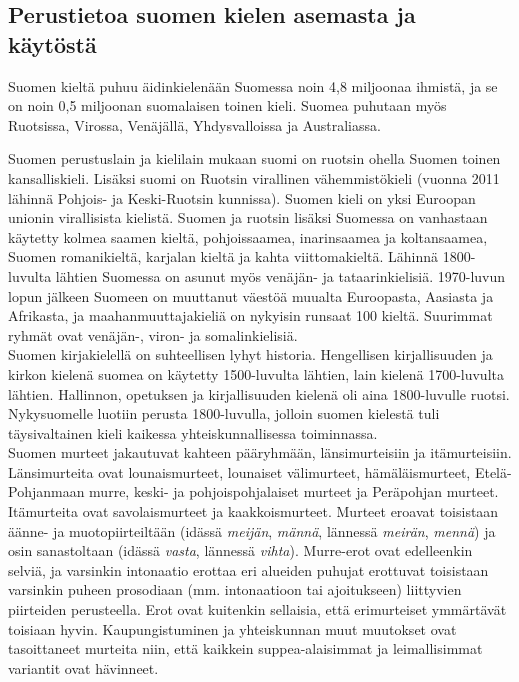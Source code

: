 \begin{multicols}{2}
\subsection{Perustietoa suomen kielen asemasta ja käytöstä}



Suomen kieltä puhuu äidinkielenään Suomessa noin 4,8 miljoonaa ihmistä, ja
se on noin 0,5 miljoonan suomalaisen toinen kieli. Suomea puhutaan myös
Ruotsissa, Virossa, Venäjällä, Yhdysvalloissa ja Australiassa.

Suomen perustuslain ja kielilain mukaan suomi on ruotsin ohella Suomen toinen
kansalliskieli. Lisäksi suomi on Ruotsin virallinen vähemmistökieli (vuonna 
2011 lähinnä Pohjois- ja Keski-Ruotsin kunnissa). Suomen kieli on yksi 
Euroopan unionin virallisista kielistä. Suomen ja ruotsin lisäksi
Suomessa on vanhastaan käytetty kolmea saamen kieltä, pohjoissaamea,
inarinsaamea ja koltansaamea, Suomen romanikieltä, karjalan kieltä ja kahta
viittomakieltä. Lähinnä 1800-luvulta lähtien Suomessa on asunut myös venäjän-
ja tataarinkielisiä. 1970-luvun lopun jälkeen Suomeen on muuttanut väestöä
muualta Euroopasta, Aasiasta ja Afrikasta, ja maahanmuuttajakieliä on nykyisin
runsaat 100 kieltä. Suurimmat ryhmät ovat venäjän-, viron- ja somalinkielisiä.\\
Suomen kirjakielellä on suhteellisen lyhyt historia. Hengellisen kirjallisuuden
ja kirkon kielenä suomea on käytetty 1500-luvulta lähtien, lain kielenä
1700-luvulta lähtien. Hallinnon, opetuksen ja kirjallisuuden kielenä oli aina
1800-luvulle ruotsi. Nykysuomelle luotiin perusta 1800-luvulla, jolloin suomen
kielestä tuli täysivaltainen kieli kaikessa yhteiskunnallisessa toiminnassa.\\
Suomen murteet jakautuvat kahteen pääryhmään, länsimurteisiin ja itämurteisiin.
Länsimurteita ovat lounaismurteet, lounaiset välimurteet, hämäläismurteet,
Etelä-Pohjanmaan murre, keski- ja pohjoispohjalaiset murteet ja Peräpohjan
murteet. Itämurteita ovat savolaismurteet ja kaakkoismurteet. Murteet eroavat
toisistaan äänne- ja muotopiirteiltään (idässä \textit{meijän}, \textit{männä}, lännessä \textit{meirän},
\textit{mennä}) ja osin sanastoltaan (idässä \textit{vasta}, lännessä \textit{vihta}). Murre-erot ovat
edelleenkin selviä, ja varsinkin intonaatio erottaa eri alueiden puhujat
erottuvat toisistaan varsinkin puheen prosodiaan (mm. intonaatioon tai
ajoitukseen) liittyvien piirteiden perusteella. Erot ovat kuitenkin sellaisia,
että erimurteiset ymmärtävät toisiaan hyvin. Kaupungistuminen ja yhteiskunnan
muut muutokset ovat tasoittaneet murteita niin, että kaikkein suppea-alaisimmat
ja leimallisimmat variantit ovat hävinneet.



\end{multicols}
